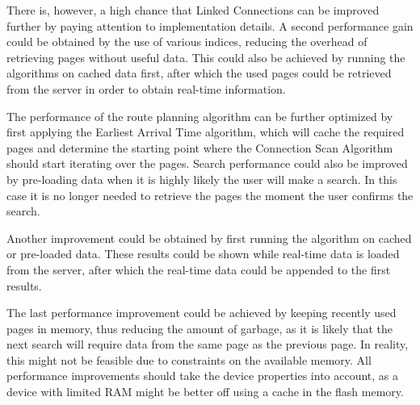 \documentclass[twocolumn]{phdsymp} %
\begin{document}
There is, however, a high chance that Linked Connections can be improved further by paying attention to implementation details. A second performance gain could be obtained by the use of various indices, reducing the overhead of retrieving pages without useful data. This could also be achieved by running the algorithms on cached data first, after which the used pages could be retrieved from the server in order to obtain real-time information.

The performance of the route planning algorithm can be further optimized by first applying the Earliest Arrival Time algorithm, which will cache the required pages and
determine the starting point where the Connection Scan Algorithm should start iterating over the pages. Search performance could also be improved by pre-loading data when it is highly likely the user will make a search. In this case it is no longer needed to retrieve the pages the moment the user confirms the search.

Another improvement could be obtained by first running the algorithm on cached or pre-loaded data. These results could be shown while real-time data is loaded from the
server, after which the real-time data could be appended to the first results.

The last performance improvement could be achieved by keeping recently used pages in memory, thus reducing the amount of garbage, as it is likely that the next search will
require data from the same page as the previous page. In reality, this might not be feasible due to constraints on the available memory. All performance improvements should take the device properties into account, as a device with limited RAM might be better off using a cache in the flash memory.

\nocite{*}

\end{document}
